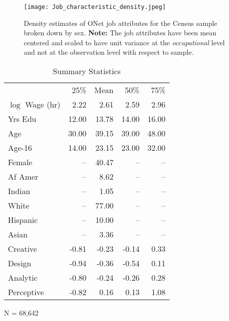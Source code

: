 \documentclass[12pt]{article}
\begin{document}
\begin{figure}[ht!]
  \texttt{[image: Job\_characteristic\_density.jpeg]}
  \caption{Density estimates of ONet job attributes for the Census sample broken down by
  sex. \textbf{Note:} The job attributes have been mean centered and scaled to
  have unit variance at the \textit{occupational} level and not at the observation
  level with respect to sample.}
  \label{fig:JobChar_vs_sex}
\end{figure}


\begin{table} \centering
  \caption{Summary Statistics}
  \begin{threeparttable}
    \begin{tabular}[l]{l r r r r}
  \cmidrule{1-5}

                   & 25\%   & Mean & 50\% & 75\%    \\
  \cmidrule{1-5}
  $\log$ Wage (hr) &  2.22 &  2.61 &  2.59  &  2.96 \\
  Yrs Edu          & 12.00 & 13.78 & 14.00  & 16.00 \\
  Age              & 30.00 & 39.15 & 39.00  & 48.00 \\
  Age-16           & 14.00 & 23.15 & 23.00  & 32.00 \\
  Female           & --    & 40.47 & --     & --    \\
  Af Amer          & --    &  8.62 & --     & --    \\
  Indian           & --    &  1.05 & --     & --    \\
  White            & --    & 77.00 & --     & --    \\
  Hispanic         & --    & 10.00 & --     & --    \\
  Asian            & --    &  3.36 & --     & --    \\
  Creative         & -0.81 & -0.23 & -0.14  &  0.33 \\
  Design           & -0.94 & -0.36 & -0.54  &  0.11 \\
  Analytic         & -0.80 & -0.24 & -0.26  &  0.28 \\
  Perceptive       & -0.82 &  0.16 &  0.13  &  1.08 \\

  \hline
    \end{tabular}
    \begin{tablenotes}
      \item{\footnotesize N = 68,642}
    \end{tablenotes} \label{tbl:census_cov_summary}
  \end{threeparttable}
\end{table}
\end{document}
